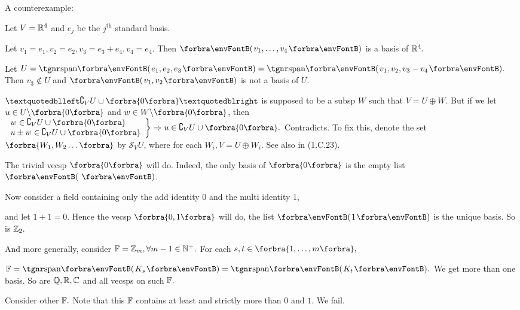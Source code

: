 \vspace{8pt}

A counterexample\hspace{1pt}$:$\par\quad
Let $V={\mathbb{R}}^4$ and $e_j$ be the $j^\text{th}$ standard basis.\par\quad
Let $v_1=e_1,v_2=e_2,v_3=e_3+e_4,v_4=e_4.$ Then $\Par{v_1,\dots,v_4}$ is a basis of ${\mathbb{R}}^4.$\par\quad
Let $U=\Span{e_1,e_2,e_3}=\Span{v_1,v_2,v_3-v_4}.$ Then $v_3\not\in U$ and $\Par{v_1,v_2}$ is not a basis of $U.$\PfEnd\SepLine

\BulletPointX{}\;\;$“\complement_V U \cup \zeroSubs”$ is supposed to be a subsp $W$ such that $V=U\oplus W$.\TextB{\vspace{4pt}}
But if we let $u\in U\backslash\zeroSubs$ and $w\in W\backslash\zeroSubs$, then $\MathRightBrace{l}{w\in\complement_V U \cup \zeroSubs\\ u\pm w\in\complement_V U \cup \zeroSubs }\Rightarrow u\in\complement_V U \cup \zeroSubs.$ Contradicts.\vspace{4pt}\TextB{}
To fix this, {\Large\envFontLarge denote the set $\Bra{W_1,W_2\dots}$ by $\mathcal{S}_V U$,} {\small where for each $W_i,V=U\oplus W_i$. See also in (1.C.23).}\par\SepLine

\par\quad
The trivial vecsp $\zeroSubs$ will do. Indeed, the only basis of $\zeroSubs$ is the empty list $\Par{\,}$.\par\quad
Now consider a field containing only the add identity $0$ and the multi identity $1$,\par\quad
and let $1+1=0.$ Hence the vecsp $\Bra{0,1}$ will do, the list $\Par{1}$ is the unique basis. So is ${\mathbb{Z}}_2.$\par\quad
And more generally, consider ${\mathbb{F}}={\mathbb{Z}}_m,\forall m-1\in{\mathbb{N}^+}.$ For each $s,t\in\Bra{1,\dots,m},$\par\quad
$\Fbb=\Span{K_s}=\Span{K_t}.$ We get more than one basis. So are ${\mathbb{Q}},{\mathbb{R}},{\mathbb{C}}$ and all vecsps on such ${\mathbb{F}}.$\par\quad
Consider other ${\mathbb{F}}.$ Note that this ${\mathbb{F}}$ contains at least and strictly more than $0$ and $1.$ We fail.\PfEnd
\SepLine

